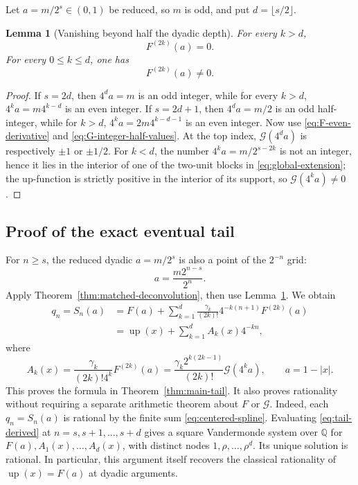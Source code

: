 \documentclass[11pt]{article}
\newtheorem{lemma}[theorem]{Lemma}
\newcommand{\Q}{\mathbb{Q}}
\newcommand{\upf}{\operatorname{up}}
\newcommand{\G}{\mathcal{G}}
\begin{document}
Let $a=m/2^s\in(0,1)$ be reduced, so $m$ is odd, and put
$d=\lfloor s/2\rfloor$.

\begin{lemma}[Vanishing beyond half the dyadic depth]
\label{lem:derivative-vanishing}
For every $k>d$,
\begin{equation}
 F^{(2k)}(a)=0.
 \label{eq:derivative-vanishing}
\end{equation}
For every $0\le k\le d$, one has
\begin{equation}
 F^{(2k)}(a)\ne0.
 \label{eq:surviving-derivatives-nonzero}
\end{equation}
\end{lemma}

\begin{proof}
If $s=2d$, then $4^da=m$ is an odd integer, while for every $k>d$,
$4^ka=m4^{k-d}$ is an even integer.  If $s=2d+1$, then $4^da=m/2$ is an odd
half-integer, while for $k>d$, $4^ka=2m4^{k-d-1}$ is an even integer.  Now use
\eqref{eq:F-even-derivative} and \eqref{eq:G-integer-half-values}.  At the top
index, $\G(4^da)$ is respectively $\pm1$ or $\pm1/2$.  For $k<d$, the
number $4^ka=m/2^{s-2k}$ is not an integer, hence it lies in the interior of
one of the two-unit blocks in \eqref{eq:global-extension}; the up-function is
strictly positive in the interior of its support, so $\G(4^ka)\ne0$.
\end{proof}

\subsection{Proof of the exact eventual tail}

For $n\ge s$, the reduced dyadic $a=m/2^s$ is also a point of the $2^{-n}$
grid:
\begin{equation}
 a=\frac{m2^{n-s}}{2^n}.
\end{equation}
Apply Theorem~\ref{thm:matched-deconvolution}, then use
Lemma~\ref{lem:derivative-vanishing}.  We obtain
\begin{align}
 q_n=S_n(a)
 &=F(a)+\sum_{k=1}^{d}
 \frac{\gamma_k}{(2k)!}4^{-k(n+1)}F^{(2k)}(a) \\
 &=\upf(x)+\sum_{k=1}^{d}A_k(x)4^{-kn},
 \label{eq:tail-derived}
\end{align}
where
\begin{equation}
 \boxed{
 A_k(x)=\frac{\gamma_k}{(2k)!4^k}F^{(2k)}(a)
 =\frac{\gamma_k2^{k(2k-1)}}{(2k)!}\G(4^ka),
 \qquad a=1-|x|.}
 \label{eq:Ak}
\end{equation}
This proves the formula in Theorem~\ref{thm:main-tail}.  It also proves
rationality without requiring a separate arithmetic theorem about $F$ or
$\G$.  Indeed, each $q_n=S_n(a)$ is rational by the finite sum
\eqref{eq:centered-spline}.  Evaluating \eqref{eq:tail-derived} at
$n=s,s+1,\ldots,s+d$ gives a square Vandermonde system over $\Q$ for
$F(a),A_1(x),\ldots,A_d(x)$, with distinct nodes
$1,\rho,\ldots,\rho^d$.  Its unique solution is rational.  In particular,
this argument itself recovers the classical rationality of $\upf(x)=F(a)$ at
dyadic arguments.
\end{document}
